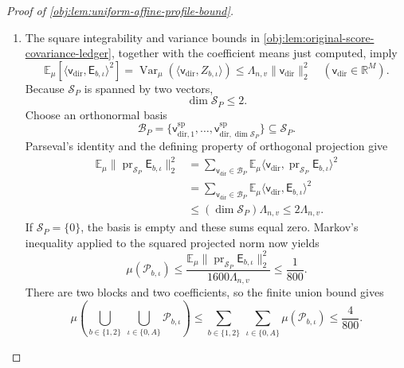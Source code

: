 \documentclass[11pt]{article}
\begin{document}
\begin{proof}[Proof of \cref{obj:lem:uniform-affine-profile-bound}]
\begin{enumerate}
\item
The square integrability and variance bounds in \cref{obj:lem:original-score-covariance-ledger}, together with the coefficient means just computed, imply
\[
\mathbb E_\mu\!\left[
\langle \mathsf v_{\mathrm{dir}},\mathsf E_{b,\iota}\rangle^2
\right]
=
\operatorname{Var}_\mu\!\left(\langle \mathsf v_{\mathrm{dir}},Z_{b,\iota}\rangle\right)
\le
\Lambda_{n,v}\|\mathsf v_{\mathrm{dir}}\|_2^2
\quad(\mathsf v_{\mathrm{dir}}\in\mathbb R^M).
\]
Because \(\mathcal S_P\) is spanned by two vectors,
\[
\dim\mathcal S_P\le2.
\]
Choose an orthonormal basis
\[
\mathcal B_P
=
\{\mathsf v^{\mathrm{sp}}_{\mathrm{dir},1},\ldots,\mathsf v^{\mathrm{sp}}_{\mathrm{dir},\dim\mathcal S_P}\}
\subseteq\mathcal S_P.
\]
Parseval's identity and the defining property of orthogonal projection give
\[
\begin{aligned}
\mathbb E_\mu
\|\operatorname{pr}_{\mathcal S_P}\mathsf E_{b,\iota}\|_2^2
&=
\sum_{\mathsf v_{\mathrm{dir}}\in\mathcal B_P}
\mathbb E_\mu
\langle \mathsf v_{\mathrm{dir}},\operatorname{pr}_{\mathcal S_P}\mathsf E_{b,\iota}\rangle^2\\
&=
\sum_{\mathsf v_{\mathrm{dir}}\in\mathcal B_P}
\mathbb E_\mu\langle \mathsf v_{\mathrm{dir}},\mathsf E_{b,\iota}\rangle^2\\
&\le
(\dim\mathcal S_P)\Lambda_{n,v}
\le2\Lambda_{n,v}.
\end{aligned}
\]
If \(\mathcal S_P=\{0\}\), the basis is empty and these sums equal zero. Markov's inequality applied to the squared projected norm now yields
\[
\mu(\mathcal P_{b,\iota})
\le
\frac{
\mathbb E_\mu
\|\operatorname{pr}_{\mathcal S_P}\mathsf E_{b,\iota}\|_2^2
}{
1600\Lambda_{n,v}
}
\le\frac1{800}.
\]
There are two blocks and two coefficients, so the finite union bound gives
\[
\mu\left(
\bigcup_{b\in\{1,2\}}\ \bigcup_{\iota\in\{0,A\}}
\mathcal P_{b,\iota}
\right)
\le
\sum_{b\in\{1,2\}}\ \sum_{\iota\in\{0,A\}}
\mu(\mathcal P_{b,\iota})
\le\frac4{800}.
\]


\end{enumerate}
\end{proof}
\end{document}
